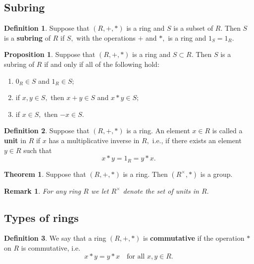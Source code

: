 \documentclass[12pt, a4paper]{article}
\newtheorem*{remark}{Remark}
\theoremstyle{definition}
\newtheorem{definition}{Definition}[section]
\newtheorem{theorem}{Theorem}[section]
\newtheorem{proposition}{Proposition}
\theoremstyle{plain}
\begin{document}
\subsection{Subring}

\begin{definition}
Suppose that $(R,+,*)$ is a ring and $S$ is a subset of $R.$ Then $S$ is a \textbf{subring} of $R$ if $S,$ with the operations $+$ and $*,$ is a ring and $1_S=1_R.$
\end{definition}

\begin{proposition}
Suppose that $(R, +, *)$ is a ring and $S \subset R.$ Then $S$ is a subring of $R$ if and only if all of the following hold: 
\begin{enumerate}
	\item $0_R \in S$ and $1_R \in S;$

	\item if $x,y \in S,$ then $x+y\in S$ and $x*y \in S;$

	\item if $x\in S,$ then $-x \in S.$	
\end{enumerate}
\end{proposition}

\begin{definition}
Suppose that $(R, +, *)$ is a ring. An element $x \in R$ is called a \textbf{unit} in $R$ if $x$ has a multiplicative inverse in $R,$ i.e., if there exists an element $y \in R$ such that 
$$x*y = 1_R =y*x.$$
\end{definition}

\begin{theorem}
Suppose that $(R, +, *)$ is a ring. Then $(R^{\times}, *)$ is a group.
\end{theorem}

\begin{remark}
For any ring $R$ we let $R^{\times}$ denote the set of units in $R.$
\end{remark}

\subsection{Types of rings}

\begin{definition}
We say that a ring $(R,+,*)$ is \textbf{commutative} if the operation $*$ on $R$ is commutative, i.e. 
$$x*y=y*x \quad \text{for all } x,y\in R.$$
\end{definition}
\end{document}
